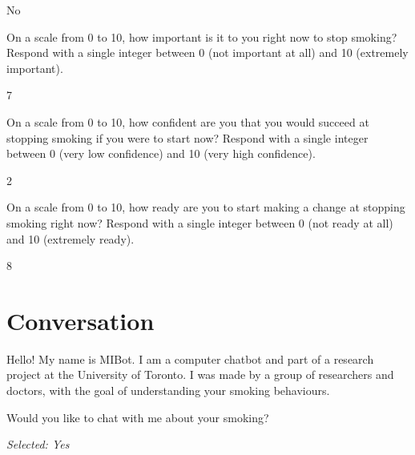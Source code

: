 \begin{clientbox}
	No
\end{clientbox}

\begin{researcherbox}
	On a scale from 0 to 10, how important is it to you right now to stop smoking? Respond with a single integer between 0 (not important at all) and 10 (extremely important).
\end{researcherbox}

\begin{clientbox}
	7
\end{clientbox}

\begin{researcherbox}
	On a scale from 0 to 10, how confident are you that you would succeed at stopping smoking if you were to start now? Respond with a single integer between 0 (very low confidence) and 10 (very high confidence).
\end{researcherbox}

\begin{clientbox}
	2
\end{clientbox}

\begin{researcherbox}
	On a scale from 0 to 10, how ready are you to start making a change at stopping smoking right now? Respond with a single integer between 0 (not ready at all) and 10 (extremely ready).
\end{researcherbox}

\begin{clientbox}
	8
\end{clientbox}

\section*{Conversation}

\begin{counsellorbox}
	Hello! My name is MIBot. I am a computer chatbot and part of a research project at the University of Toronto. I was made by a group of researchers and doctors, with the goal of understanding your smoking behaviours.
\end{counsellorbox}

\begin{counsellorbox}
	Would you like to chat with me about your smoking?
\end{counsellorbox}

\begin{clientbox}
	\textit{Selected: Yes}
\end{clientbox}

